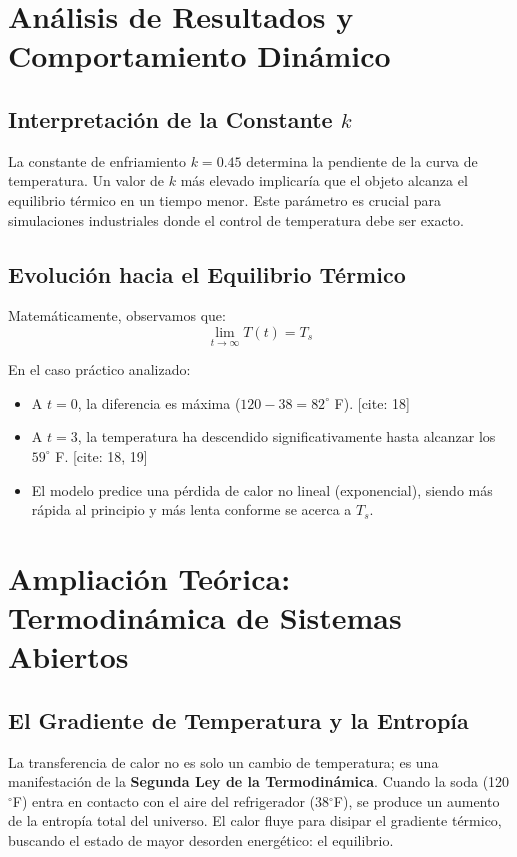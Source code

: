 \documentclass[12pt]{article}
\begin{document}
\section{Análisis de Resultados y Comportamiento Dinámico}

\subsection{Interpretación de la Constante $k$}
La constante de enfriamiento $k = 0.45$ determina la pendiente de la curva de temperatura. Un valor de $k$ más elevado implicaría que el objeto alcanza el equilibrio térmico en un tiempo menor. Este parámetro es crucial para simulaciones industriales donde el control de temperatura debe ser exacto.

\subsection{Evolución hacia el Equilibrio Térmico}
Matemáticamente, observamos que:
\[ \lim_{t \to \infty} T(t) = T_s \]

En el caso práctico analizado:
\begin{itemize}
    \item A $t = 0$, la diferencia es máxima ($120 - 38 = 82^\circ$ F). [cite: 18]
    \item A $t = 3$, la temperatura ha descendido significativamente hasta alcanzar los $59^\circ$ F. [cite: 18, 19]
    \item El modelo predice una pérdida de calor no lineal (exponencial), siendo más rápida al principio y más lenta conforme se acerca a $T_s$.
\end{itemize}
\section{Ampliación Teórica: Termodinámica de Sistemas Abiertos}

\subsection{El Gradiente de Temperatura y la Entropía}
La transferencia de calor no es solo un cambio de temperatura; es una manifestación de la \textbf{Segunda Ley de la Termodinámica}. Cuando la soda (120$^\circ$F) entra en contacto con el aire del refrigerador (38$^\circ$F), se produce un aumento de la entropía total del universo. El calor fluye para disipar el gradiente térmico, buscando el estado de mayor desorden energético: el equilibrio.
\end{document}
